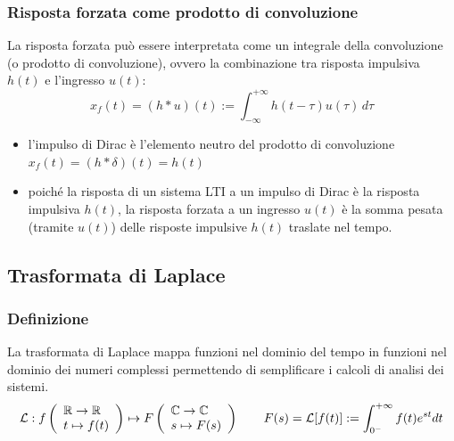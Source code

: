 \subsubsection*{Risposta forzata come prodotto di convoluzione}
La risposta forzata può essere interpretata come un integrale della convoluzione (o prodotto di convoluzione), ovvero la
combinazione tra risposta impulsiva \(h(t)\) e l'ingresso \(u(t)\):
\[x_f(t) = (h * u)(t) := \int_{-\infty}^{+\infty} h(t - \tau) u(\tau) \, d\tau\]

\begin{itemize}
	\item l'impulso di Dirac è l'elemento neutro del prodotto di convoluzione \(x_f(t) = (h * \delta)(t) = h(t)\)
	\item poiché la risposta di un sistema LTI a un impulso di Dirac è la risposta impulsiva \(h(t)\), la risposta forzata a un
	ingresso \(u(t)\) è la somma pesata (tramite \(u(t)\)) delle risposte impulsive \(h(t)\) traslate nel tempo.
\end{itemize}

\subsection{Trasformata di Laplace}
\subsubsection*{Definizione}
La trasformata di Laplace mappa funzioni nel dominio del tempo in funzioni nel dominio dei numeri complessi permettendo di
semplificare i calcoli di analisi dei sistemi.
\[\mathcal{L} : f \left(\begin{array}{l} \mathbb{R} \to \mathbb{R} \\ t \mapsto f(t) \end{array}\right) \mapsto F \left(\begin{array}{l} \mathbb{C} \to \mathbb{C} \\ s \mapsto F(s) \end{array}\right) \qquad F(s) = \mathcal{L}[f(t)] := \int_{0^-}^{+\infty} f(t) e^{st} dt\]

